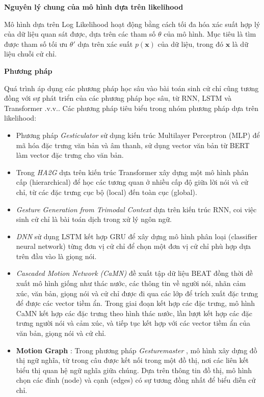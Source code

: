 \textbf{Nguyên lý chung của mô hình dựa trên likelihood}

Mô hình dựa trên Log Likelihood hoạt động bằng cách tối đa hóa xác suất hợp lý của dữ liệu quan sát được, dựa trên các tham số $\theta$ của mô hình. Mục tiêu là tìm được tham số tối ưu $\theta'$ dựa trên xác suất $p(\mathbf{x})$ của dữ liệu, trong đó $\mathbf{x}$ là dữ liệu chuỗi cử chỉ.

\textbf{Phương pháp}

Quá trình áp dụng các phương pháp học sâu vào bài toán sinh cử chỉ cũng tương đồng với sự phát triển của các phương pháp học sâu, từ RNN, LSTM và Transformer .v.v.. Các phương pháp tiêu biểu trong nhóm phương pháp dựa trên likelihood:

\begin{itemize}[]
	\item Phương pháp \textit{Gesticulator} \cite{kucherenko2020gesticulator} sử dụng kiến trúc Multilayer Perceptron (MLP) để mã hóa đặc trưng văn bản và âm thanh, sử dụng vector văn bản từ BERT làm vector đặc trưng cho văn bản. 
	
	\item Trong \textit{HA2G} \cite{liu2022learning} dựa trên kiến trúc Transformer xây dựng một mô hình phân cấp (hierarchical) để học các tương quan ở nhiều cấp độ giữa lời nói và cử chỉ, từ các đặc trưng cục bộ (local) đến toàn cục (global). 
	
	\item \textit{Gesture Generation from Trimodal Context} \cite{yoon2020speech} dựa trên kiến trúc RNN, coi việc sinh cử chỉ là bài toán dịch trong xử lý ngôn ngữ. 
	
	\item \textit{DNN} \cite{chiu2015predicting} sử dụng LSTM kết hợp GRU để xây dựng mô hình phân loại (classifier neural network) từng đơn vị cử chỉ để chọn một đơn vị cử chỉ phù hợp dựa trên đầu vào là giọng nói. 
	
	\item \textit{Cascaded Motion Network (CaMN)} \cite{liu2022beat} đề xuất tập dữ liệu BEAT đồng thời đề xuất mô hình giống như thác nước, các thông tin về người nói, nhãn cảm xúc, văn bản, giọng nói và cử chỉ được đi qua các lớp để trích xuất đặc trưng để được các vector tiềm ẩn. Trong giai đoạn kết hợp các đặc trưng, mô hình CaMN kết hợp các đặc trưng theo hình thác nước, lần lượt kết hợp các đặc trưng người nói và cảm xúc, và tiếp tục kết hợp với các vector tiềm ẩn của văn bản, giọng nói và cử chỉ.
	
	\item \textbf{Motion Graph} : Trong phương pháp \textit{Gesturemaster} \cite{zhou2022gesturemaster}, mô hình xây dựng đồ thị ngữ nghĩa, từ trong câu được kết nối trong một đồ thị, nơi các liên kết biểu thị quan hệ ngữ nghĩa giữa chúng. Dựa trên thông tin đồ thị, mô hình chọn các đỉnh (node) và cạnh (edges) có sự tương đồng nhất để biểu diễn cử chỉ. 
	
\end{itemize}

